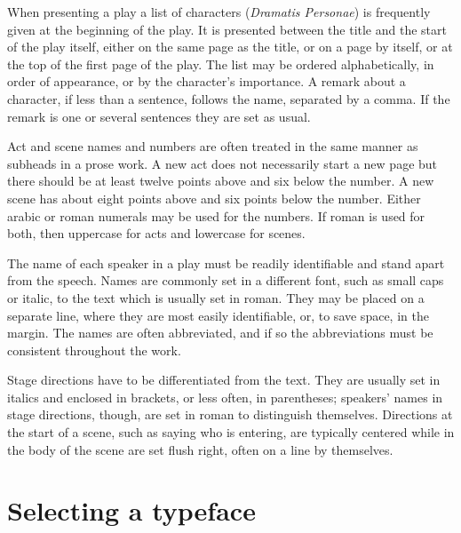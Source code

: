 \documentclass[10pt,a4paper,extrafontsizes]{memoir}
\newcommand{\PWnote}[2]{}
\begin{document}
\begin{paracol}{2}
\switchEng
    When presenting a play a list of characters 
(\textit{Dramatis Personae})
is frequently given at the beginning of the play. It is presented between the
title and the start of the play itself, either on the same page as the title, 
or on a page by itself, or at the top of the first page of the play. The 
list may be ordered alphabetically, in order of appearance, or by the 
character's importance. A remark about a character, if less than a sentence, 
follows the name, separated by a comma. If the remark is one or several 
sentences they are set as usual.

    Act and scene 
names and numbers are often treated in the same manner as
subheads in a prose work. A new act does not necessarily start a new page
but there should be at least twelve points above and six below the number.
A new scene has about eight points above and six points below the number.
Either arabic or roman numerals may be used for the numbers. If roman
is used for both, then uppercase for acts and lowercase for scenes.

   The name of each speaker in a play must be readily 
identifiable and stand apart from the speech. Names are commonly set in a 
different font, such as small caps or italic, to the text which is usually set
in roman. They may be placed on a separate line, where they are most easily
identifiable, or, to save space, in the margin. The names are often 
abbreviated, and if so the abbreviations must be consistent throughout 
the work.

    Stage directions 
have to be differentiated from the text. They are usually set in italics 
and enclosed in brackets, or less often, in parentheses; speakers' names 
in stage directions, though, are set in roman to distinguish themselves. 
Directions at the start of a scene, such as saying who is entering, are 
typically centered while in the body of the scene are set flush right, 
often on a line by themselves.
\end{paracol}

\PWnote{2009/04/26}{Added section on selecting a typeface}
\section{Selecting a typeface}
\end{document}
